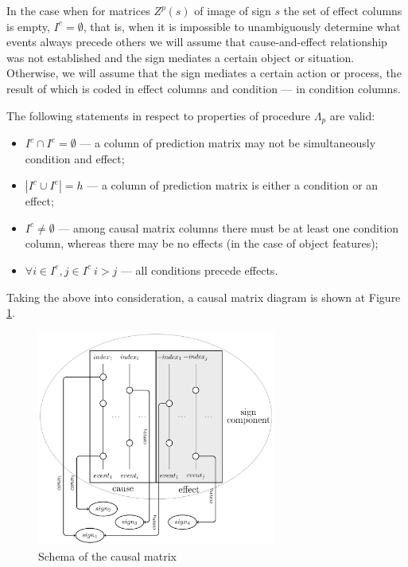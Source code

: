\documentclass[review]{elsarticle}
\begin{document}
In the case when for matrices $Z^p(s)$ of image of sign $s$ the set of effect columns is empty, $I^e=\emptyset$, that is, when it is impossible to unambiguously determine what events always precede others we will assume that cause-and-effect relationship was not established and the sign mediates a certain object or situation. Otherwise, we will assume that the sign mediates a certain action or process, the result of which is coded in effect columns and condition --- in condition columns. 

The following statements in respect to properties of procedure $\Lambda_p$ are valid:
\begin{itemize}
	\item $I^c\cap I^e=\emptyset$ --- a column of prediction matrix may not be simultaneously condition and effect;
	\item $|I^c\cup I^e|=h$ --- a column of prediction matrix is either a condition or an effect;
	\item $I^c\not = \emptyset$ --- among causal matrix columns there must be at least one condition column, whereas there may be no effects (in the case of object features);
	\item $\forall i\in I^e, j\in I^c\ i>j$ --- all conditions precede effects.
\end{itemize}
Taking the above into consideration, a causal matrix diagram is shown at Figure \ref{fig:caus_matr}.

\begin{figure}
	\centering
	\includegraphics[width=0.7\textwidth]{caus_matr}
	\caption{Schema of the causal matrix}	
	\label{fig:caus_matr}	
\end{figure}
\end{document}
